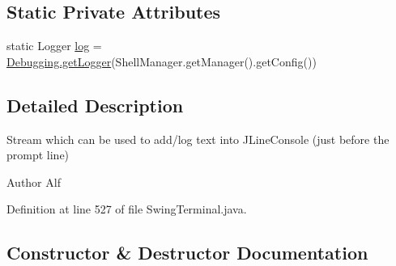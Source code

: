 \subsection*{Static Private Attributes}
\begin{DoxyCompactItemize}
\item 
static Logger \hyperlink{classgov_1_1nasa_1_1jpf_1_1inspector_1_1frontends_1_1jpfshell_1_1gui_1_1_swing_terminal_1_1_j_line_user_text_output_stream_a1f97ec48a81d4c7ecee91cd231b5753c}{log} = \hyperlink{classgov_1_1nasa_1_1jpf_1_1inspector_1_1utils_1_1_debugging_a06cdc92a97816ad85793b034bfd5822a}{Debugging.\+get\+Logger}(Shell\+Manager.\+get\+Manager().get\+Config())
\end{DoxyCompactItemize}


\subsection{Detailed Description}
Stream which can be used to add/log text into J\+Line\+Console (just before the prompt line) 

\begin{DoxyAuthor}{Author}
Alf 
\end{DoxyAuthor}


Definition at line 527 of file Swing\+Terminal.\+java.



\subsection{Constructor \& Destructor Documentation}
